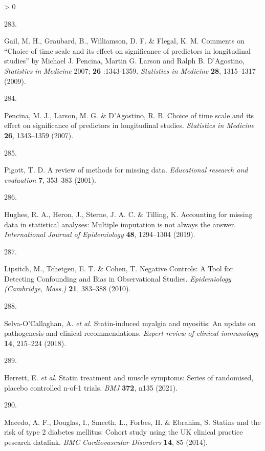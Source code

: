 \documentclass[a4paper, twoside]{templates/ociamthesis}
\newlength{\cslhangindent}
\newlength{\csllabelwidth}
\newenvironment{CSLReferences}[3] %
 {%
  \setlength{\parindent}{0pt}
  \ifodd #1 \everypar{\setlength{\hangindent}{\cslhangindent}}\ignorespaces\fi
  \ifnum #2 > 0
  \setlength{\parskip}{#2\baselineskip}
  \fi
 }%
 {}
\newcommand{\CSLLeftMargin}[1]{\parbox[t]{\maxof{\widthof{#1}}{\csllabelwidth}}{#1}}
\newcommand{\CSLRightInline}[1]{\parbox[t]{\linewidth - \csllabelwidth}{#1}}
\begin{document}
\begin{CSLReferences}{0}{0}
\leavevmode\hypertarget{ref-gail2009}{}%
\CSLLeftMargin{283. }
\CSLRightInline{Gail, M. H., Graubard, B., Williamson, D. F. \& Flegal, K. M. Comments on {``{Choice} of time scale and its effect on significance of predictors in longitudinal studies''} by {Michael J}. {Pencina}, {Martin G}. {Larson} and {Ralph B}. {D}'{Agostino}, {\emph{Statistics}}{ \emph{in} }{\emph{Medicine}} 2007; {\textbf{26}} :1343-1359. \emph{Statistics in Medicine} \textbf{28}, 1315--1317 (2009).}

\leavevmode\hypertarget{ref-pencina2007}{}%
\CSLLeftMargin{284. }
\CSLRightInline{Pencina, M. J., Larson, M. G. \& D'Agostino, R. B. Choice of time scale and its effect on significance of predictors in longitudinal studies. \emph{Statistics in Medicine} \textbf{26}, 1343--1359 (2007).}

\leavevmode\hypertarget{ref-pigott2001review}{}%
\CSLLeftMargin{285. }
\CSLRightInline{Pigott, T. D. A review of methods for missing data. \emph{Educational research and evaluation} \textbf{7}, 353--383 (2001).}

\leavevmode\hypertarget{ref-hughes2019}{}%
\CSLLeftMargin{286. }
\CSLRightInline{Hughes, R. A., Heron, J., Sterne, J. A. C. \& Tilling, K. Accounting for missing data in statistical analyses: Multiple imputation is not always the answer. \emph{International Journal of Epidemiology} \textbf{48}, 1294--1304 (2019).}

\leavevmode\hypertarget{ref-lipsitch2010}{}%
\CSLLeftMargin{287. }
\CSLRightInline{Lipsitch, M., Tchetgen, E. T. \& Cohen, T. Negative {Controls}: A {Tool} for {Detecting Confounding} and {Bias} in {Observational Studies}. \emph{Epidemiology (Cambridge, Mass.)} \textbf{21}, 383--388 (2010).}

\leavevmode\hypertarget{ref-selva-ocallaghan2018}{}%
\CSLLeftMargin{288. }
\CSLRightInline{Selva-O'Callaghan, A. \emph{et al.} Statin-induced myalgia and myositis: An update on pathogenesis and clinical recommendations. \emph{Expert review of clinical immunology} \textbf{14}, 215--224 (2018).}

\leavevmode\hypertarget{ref-herrett2021}{}%
\CSLLeftMargin{289. }
\CSLRightInline{Herrett, E. \emph{et al.} Statin treatment and muscle symptoms: Series of randomised, placebo controlled n-of-1 trials. \emph{BMJ} \textbf{372}, n135 (2021).}

\leavevmode\hypertarget{ref-macedo2014}{}%
\CSLLeftMargin{290. }
\CSLRightInline{Macedo, A. F., Douglas, I., Smeeth, L., Forbes, H. \& Ebrahim, S. Statins and the risk of type 2 diabetes mellitus: Cohort study using the {UK} clinical practice pesearch datalink. \emph{BMC Cardiovascular Disorders} \textbf{14}, 85 (2014).}


\end{CSLReferences}
\end{document}
